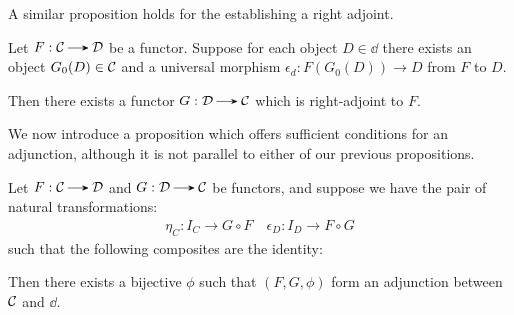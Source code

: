     A similar proposition holds for the establishing a right adjoint.
    \begin{proposition}
        Let $F: \cc \to \dd$ be a functor. Suppose for each object $D
        \in \dd$ there exists an object $G_0(D) \in \mathcal{C}$ 
        and a universal morphism $\epsilon_d: F(G_0(D)) \to
        D$ from $F$ to $D$.
        
        Then there exists a functor $G: \dd \to \cc$ which is right-adjoint 
        to $F$. 
    \end{proposition}

    We now introduce a proposition which offers sufficient conditions
    for an adjunction, although it is not parallel to either of our
    previous propositions. 

    \begin{proposition}
        Let $F: \cc \to \dd$ and $G: \dd \to \cc$ be functors, and
        suppose we have the pair of natural transformations:
        \begin{align*}
            \eta_{C} : I_C \to G \circ F \quad
            \epsilon_{D}: I_D \to F \circ G
        \end{align*}
        such that the following composites are the identity: 
        \begin{center}
            \hspace{0.5cm}
        \end{center}
        Then there exists a bijective $\phi$ such that $(F, G, \phi)$
        form an adjunction between $\mathcal{C}$ and $\dd$. 
    \end{proposition}


